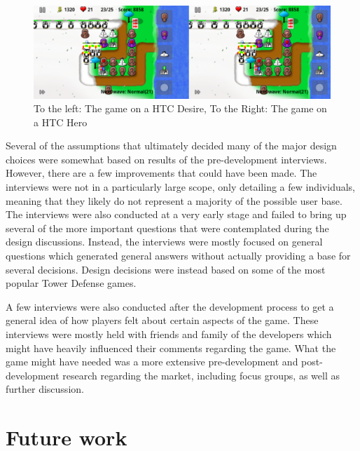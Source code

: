 \begin{figure}[here]

\begin{center}
\includegraphics[scale=0.4]{pics/chapters/chapter5/frankingame}
\end{center}

\caption{To the left: The game on a HTC Desire, To the Right: The game on a HTC Hero}
\label{fig:desirehero}

\end{figure}
Several of the assumptions that ultimately decided many of the major design choices were somewhat based on results of the pre-development interviews. However, there are a few improvements that could have been made. The interviews were not in a particularly large scope, only detailing a few individuals, meaning that they likely do not represent a majority of the possible user base. The interviews were also conducted at a very early stage and failed to bring up several of the more important questions that were contemplated during the design discussions. Instead, the interviews were mostly focused on general questions which generated general answers without actually providing a base for several decisions. Design decisions were instead based on some of the most popular Tower Defense games.

A few interviews were also conducted after the development process to get a general idea of how players felt about certain aspects of the game. These interviews were mostly held with friends and family of the developers which might have heavily influenced their comments regarding the game. What the game might have needed was a more extensive pre-development and post-development research regarding the market, including focus groups, as well as further discussion. \citep{communication}
\section{Future work}

